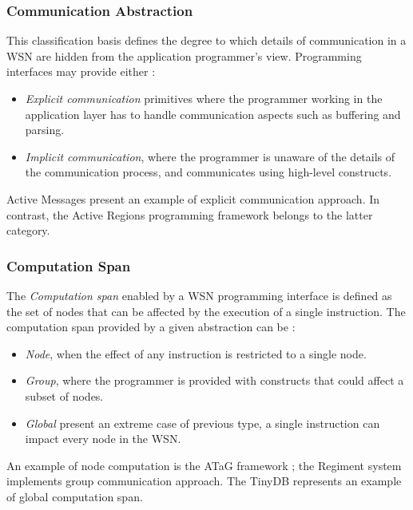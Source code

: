\subsubsection{Communication Abstraction}

This classification basis defines the degree to which details of communication
in a WSN are hidden from the application programmer's view. Programming
interfaces may provide either \cite{mottola_middleware:2008}:
\begin{itemize}
  \item \emph{Explicit communication} primitives where the
  programmer working in the application layer has to handle communication
  aspects such as buffering and parsing. 
  \item \emph{Implicit communication}, where the programmer is unaware of the
  details of the communication process, and communicates using
  high-level constructs.
\end{itemize}

Active Messages \cite{activemessagesEicken:2001} present an example of
explicit communication approach. In contrast, the Active Regions programming
framework \cite{activeregions:2004} belongs to the latter category.

\subsubsection{Computation Span}

The \emph{Computation span} enabled by a WSN programming interface is defined
as the set of nodes that can be affected by the execution of a single
instruction. The
computation span provided by a given abstraction can be
\cite{mottola_middleware:2008}:

\begin{itemize}
  \item \emph{Node}, when the effect of any instruction is restricted to a
  single node.
  \item \emph{Group}, where the programmer is provided with constructs that
  could affect a subset of nodes. 
  \item \emph{Global} present an extreme case of previous type, a single
  instruction can impact every node in the WSN.
\end{itemize}

An example of node computation is the ATaG framework \cite{atag:2005}; the
Regiment system \cite{regiment:2007} implements group communication approach. The
TinyDB \cite{madden_TinyDB:2005} represents an example of global computation
span.

